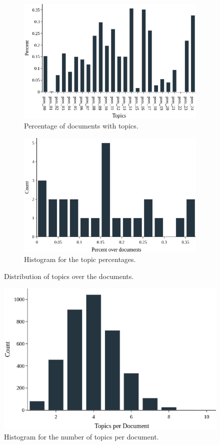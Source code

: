 \begin{figure}[h!]
	\begin{subfigure}{0.49\textwidth}
		\includegraphics[width=\linewidth]{01.Chapters/05.Results/pres-percentage-bar}
		\caption{Percentage of documents with topics.}
		\label{fig:pres-percentage-bar}
	\end{subfigure}%
	\hfill
	\begin{subfigure}{0.49\textwidth}
		\includegraphics[width=\linewidth]{01.Chapters/05.Results/pres-percentage-hist}
		\caption{Histogram for the topic percentages.}
		\label{fig:pres-percentage-hist}
	\end{subfigure}%
	\caption{Distribution of topics over the documents.}
	\label{fig:pres-topic-dist}
\end{figure}

\begin{figure}[h!]
	\centering
	\includegraphics[width=0.6\linewidth]{01.Chapters/05.Results/pres-topic-per-doc}
	\caption{Histogram for the number of topics per document.}
	\label{fig:pres-topic-per-doc}
\end{figure}

